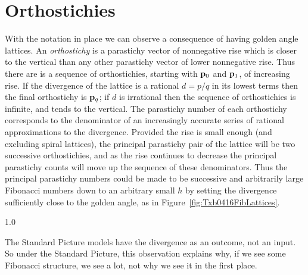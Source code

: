 \section{Orthostichies}
With the notation in place we can observe a consequence of having golden angle lattices. An \textit{orthostichy} is a parastichy vector of nonnegative rise which is closer to the vertical than any other parastichy vector of lower nonnegative rise.%
 Thus there are is a sequence of orthostichies,  starting with ${\mathbf p}_{0}$ and ${\mathbf p}_{1}$, of increasing rise. If the divergence of the lattice is a rational $d=p/q$ in its lowest terms then the final orthostichy is ${\mathbf p}_{q}$; if $d$ is irrational then the sequence of orthostichies is infinite, and tends to the vertical. The parastichy number of each orthostichy corresponds to the denominator of an increasingly accurate series of rational approximations to the divergence. Provided the rise is small enough (and excluding spiral lattices), the principal parastichy pair of the lattice will be two successive orthostichies,
and as the rise continues to decrease the principal parastichy counts will move up the sequence of these denominators. Thus the principal parastichy numbers could be made to be successive and arbitrarily large Fibonacci numbers down to an arbitrary small $h$ by setting the divergence sufficiently close to the golden angle, as in Figure~\ref{fig:Txb0416FibLattices}.

{1.0}

The Standard Picture models have the divergence as an outcome, not an input. So under the Standard Picture, this observation explains why, if we see some Fibonacci structure, we see a lot, not why we see it in the first place. 



